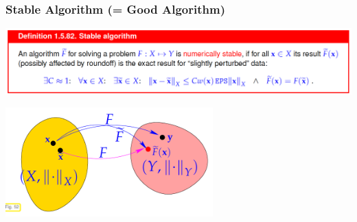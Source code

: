 \documentclass[12pt, a4paper]{article}
\begin{document}
\subsubsection{Stable Algorithm (= Good Algorithm)}
\begin{center}
	 \includegraphics[width=1.0\textwidth]{stable_algorithm1.png}
\end{center}

\begin{center}
	 \includegraphics[width=0.6\textwidth]{stable_algorithm2.png}
\end{center}



 
\end{document}
